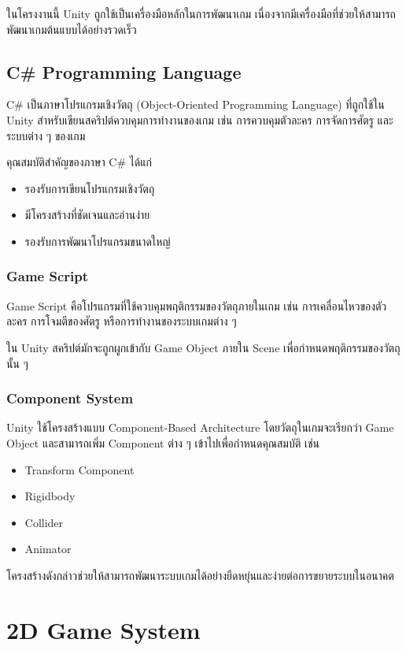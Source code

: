 ในโครงงานนี้ Unity ถูกใช้เป็นเครื่องมือหลักในการพัฒนาเกม เนื่องจากมีเครื่องมือที่ช่วยให้สามารถพัฒนาเกมต้นแบบได้อย่างรวดเร็ว

\subsection{C\# Programming Language}

C\# เป็นภาษาโปรแกรมเชิงวัตถุ (Object-Oriented Programming Language) ที่ถูกใช้ใน Unity สำหรับเขียนสคริปต์ควบคุมการทำงานของเกม เช่น การควบคุมตัวละคร การจัดการศัตรู และระบบต่าง ๆ ของเกม

คุณสมบัติสำคัญของภาษา C\# ได้แก่

\begin{itemize}
\item รองรับการเขียนโปรแกรมเชิงวัตถุ
\item มีโครงสร้างที่ชัดเจนและอ่านง่าย
\item รองรับการพัฒนาโปรแกรมขนาดใหญ่
\end{itemize}

\subsubsection{Game Script}

Game Script คือโปรแกรมที่ใช้ควบคุมพฤติกรรมของวัตถุภายในเกม เช่น การเคลื่อนไหวของตัวละคร การโจมตีของศัตรู หรือการทำงานของระบบเกมต่าง ๆ

ใน Unity สคริปต์มักจะถูกผูกเข้ากับ Game Object ภายใน Scene เพื่อกำหนดพฤติกรรมของวัตถุนั้น ๆ

\subsubsection{Component System}

Unity ใช้โครงสร้างแบบ Component-Based Architecture โดยวัตถุในเกมจะเรียกว่า Game Object และสามารถเพิ่ม Component ต่าง ๆ เข้าไปเพื่อกำหนดคุณสมบัติ เช่น

\begin{itemize}
\item Transform Component
\item Rigidbody
\item Collider
\item Animator
\end{itemize}

โครงสร้างดังกล่าวช่วยให้สามารถพัฒนาระบบเกมได้อย่างยืดหยุ่นและง่ายต่อการขยายระบบในอนาคต

\section{2D Game System}

